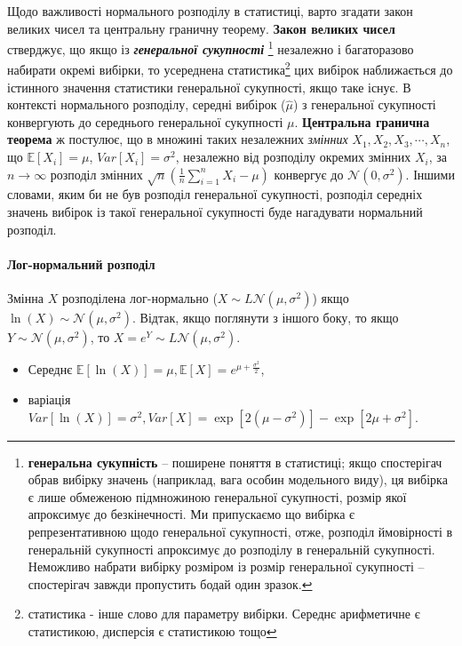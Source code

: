\documentclass[
  11pt,
]{book}
\begin{document}
Щодо важливості нормального розподілу в статистиці, варто згадати закон
великих чисел та центральну граничну теорему. \textbf{Закон великих
чисел} стверджує, що якщо із \textbf{\emph{генеральної сукупності}}
\footnote{\textbf{генеральна сукупність} -- поширене поняття в
  статистиці; якщо спостерігач обрав вибірку значень (наприклад, вага
  особин модельного виду), ця вибірка є лише обмеженою підмножиною
  генеральної сукупності, розмір якої апроксимує до безкінечності. Ми
  припускаємо що вибірка є репрезентативною щодо генеральної сукупності,
  отже, розподіл ймовірності в генеральній сукупності апроксимує до
  розподілу в генеральній сукупності. Неможливо набрати вибірку розміром
  із розмір генеральної сукупності -- спостерігач завжди пропустить
  бодай один зразок.} незалежно і багаторазово набирати окремі вибірки,
то усереднена статистика\footnote{статистика - інше слово для параметру
  вибірки. Середнє арифметичне є статистикою, дисперсія є статистикою
  тощо} цих вибірок наближається до істинного значення статистики
генеральної сукупності, якщо таке існує. В контексті нормального
розподілу, середні вибірок (\(\hat{\mu}\)) з генеральної сукупності
конвергують до середнього генеральної сукупності \(\mu\).
\textbf{Центральна гранична теорема} ж постулює, що в множині таких
незалежних \emph{змінних} \(X_1, X_2, X_3, \cdots, X_n\), що
\(\mathbb{E} [X_i] = \mu\), \(Var[X_i] = \sigma^2\), незалежно від
розподілу окремих змінних \(X_i\), за \(n \rightarrow \infty\) розподіл
змінних \(\sqrt{n} (\frac{1}{n}\sum \limits_{i=1}^n X_i - \mu)\)
конвергує до \(\mathcal{N}(0,  \sigma^2)\). Іншими словами, яким би не
був розподіл генеральної сукупності, розподіл середніх значень вибірок
із такої генеральної сукупності буде нагадувати нормальний розподіл.

\paragraph{Лог-нормальний
розподіл}\label{ux43bux43eux433-ux43dux43eux440ux43cux430ux43bux44cux43dux438ux439-ux440ux43eux437ux43fux43eux434ux456ux43b}

Змінна \(X\) розподілена лог-нормально
(\(X \sim L\mathcal{N}(\mu, \sigma^2)\)) якщо
\(\ln(X) \sim \mathcal{N}(\mu, \sigma^2)\). Відтак, якщо поглянути з
іншого боку, то якщо \(Y \sim \mathcal{N}(\mu, \sigma^2)\), то
\(X = e^Y \sim L\mathcal{N}(\mu, \sigma^2)\).

\begin{itemize}
\item
  Середнє
  \(\mathbb{E} [\ln (X)] = \mu, \mathbb{E}[X] = e^{\mu + \frac{\sigma^2}{2}}\),
\item
  варіація
  \(Var[\ln(X)] = \sigma^2, Var[X] = \exp [2(\mu - \sigma^2)] - \exp [2 \mu + \sigma^2]\).
\end{itemize}
\end{document}
